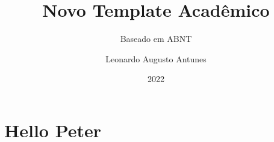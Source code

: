 \documentclass{AcademicNew}
\author{Leonardo Augusto Antunes}
\title{Novo Template Acadêmico}
\subtitle{Baseado em ABNT}
\date{2022}
\begin{document}
    \cover
    \titlePage
    \contents
    
    
    \biblio

    \newpage
    \appendix
    \section{Hello Peter}
\end{document}
